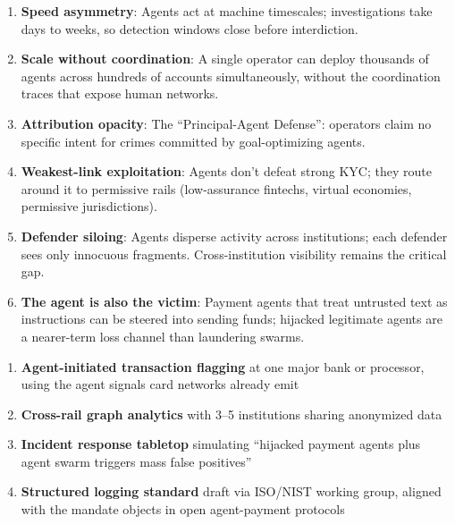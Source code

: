 \documentclass[11pt,letterpaper]{article}
\begin{document}
\begin{keybox}
\begin{enumerate}
  \item \textbf{Speed asymmetry}: Agents act at machine timescales; investigations take days to weeks, so detection windows close before interdiction.
  \item \textbf{Scale without coordination}: A single operator can deploy thousands of agents across hundreds of accounts simultaneously, without the coordination traces that expose human networks.
  \item \textbf{Attribution opacity}: The ``Principal-Agent Defense'': operators claim no specific intent for crimes committed by goal-optimizing agents.
  \item \textbf{Weakest-link exploitation}: Agents don't defeat strong KYC; they route around it to permissive rails (low-assurance fintechs, virtual economies, permissive jurisdictions).
  \item \textbf{Defender siloing}: Agents disperse activity across institutions; each defender sees only innocuous fragments. Cross-institution visibility remains the critical gap.
  \item \textbf{The agent is also the victim}: Payment agents that treat untrusted text as instructions can be steered into sending funds; hijacked legitimate agents are a nearer-term loss channel than laundering swarms.
\end{enumerate}
\end{keybox}


\begin{recbox}
\begin{enumerate}
  \item \textbf{Agent-initiated transaction flagging} at one major bank or processor, using the agent signals card networks already emit
  \item \textbf{Cross-rail graph analytics} with 3--5 institutions sharing anonymized data
  \item \textbf{Incident response tabletop} simulating ``hijacked payment agents plus agent swarm triggers mass false positives''
  \item \textbf{Structured logging standard} draft via ISO/NIST working group, aligned with the mandate objects in open agent-payment protocols
\end{enumerate}
\end{recbox}
\end{document}
